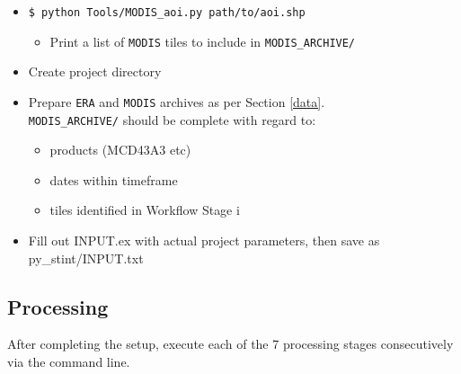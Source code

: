 \documentclass[twoside,a4paper]{refart}
\begin{document}
\begin{itemize}
    \item
        \texttt{\$ python Tools/MODIS\_aoi.py path/to/aoi.shp}
        \begin{itemize}
            \item
                Print a list of \texttt{MODIS} tiles to include in \texttt{MODIS\_ARCHIVE/}
        \end{itemize}
    
    \item
        Create project directory
    \item
        Prepare \texttt{ERA} and \texttt{MODIS} archives 
        as per Section \ref{data}.  \\
        \texttt{MODIS\_ARCHIVE/} should be complete
        with regard to:
        \begin{itemize}
        \item
            products (MCD43A3 etc)
        \item
            dates within timeframe
        \item
            tiles identified in Workflow Stage i
        \end{itemize}
    \item
        Fill out INPUT.ex with actual project parameters, 
        then save as py\_stint/INPUT.txt
\end{itemize}
\newpage
\subsection{Processing}
After completing the setup, execute each of the 7 processing stages consecutively via the command line.
\end{document}
